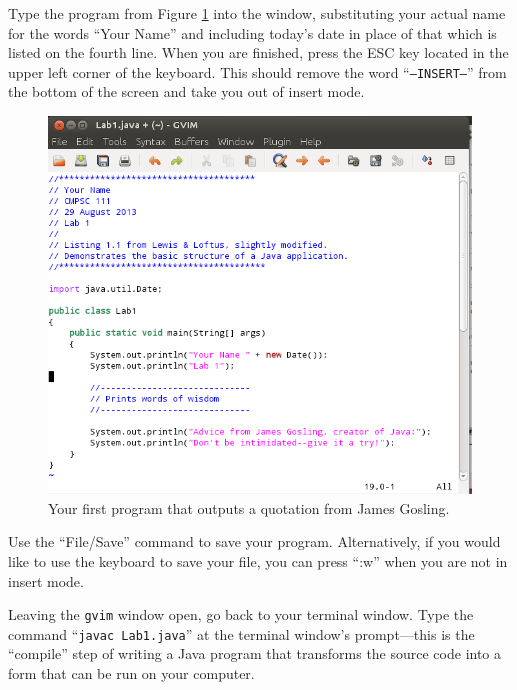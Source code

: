 Type the program from Figure \ref{lab1prog} into the window, substituting your actual name for the words ``Your Name''
and including today's date in place of that which is listed on the fourth line. When you are finished, press the ESC
key located in the upper left corner of the keyboard.  This should remove the word ``{\tt --INSERT--}'' from the bottom
of the screen and take you out of insert mode.

\begin{figure}[tbp]
  \centering
  \includegraphics[width=5.8in]{images/lab1prog}
  \caption{Your first program that outputs a quotation from James Gosling.}
  \label{lab1prog}
\end{figure}

Use the ``File/Save'' command to save your program. Alternatively, if you would like to use the keyboard to save your
file, you can press ``:w'' when you are not in insert mode.


Leaving the {\tt gvim} window open, go back to your terminal window. Type the command ``{\tt javac Lab1.java}'' at the
terminal window's prompt---this is the ``compile'' step of writing a Java program that transforms the source code into a
form that can be run on your computer.

